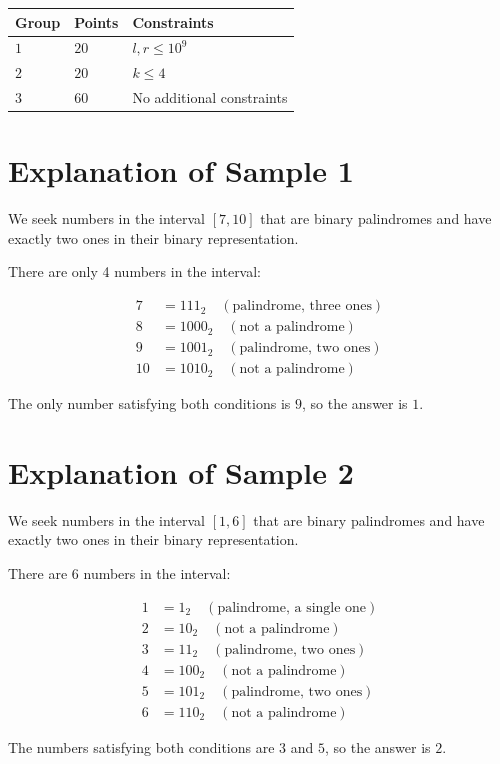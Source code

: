 \noindent
\begin{tabular}{| l | l | p{12cm} |}
  \hline
  \textbf{Group} & \textbf{Points} & \textbf{Constraints} \\ \hline
  $1$    & $20$       & $l,r \leq 10^9$ \\ \hline
  $2$    & $20$       & $k \leq 4$ \\ \hline
  $3$    & $60$       & No additional constraints \\ \hline
\end{tabular}

\section*{Explanation of Sample 1}

We seek numbers in the interval $[7, 10]$ that are binary palindromes and have exactly two ones in their binary representation.

There are only 4 numbers in the interval:

\begin{align*}
7 &= 111_2 \quad (\text{palindrome, three ones}) \\ 
8 &= 1000_2 \quad (\text{not a palindrome}) \\
9 &= 1001_2 \quad (\text{palindrome, two ones}) \\
10 &= 1010_2 \quad (\text{not a palindrome})
\end{align*}

The only number satisfying both conditions is $9$, so the answer is $1$.

\section*{Explanation of Sample 2}

We seek numbers in the interval $[1, 6]$ that are binary palindromes and have exactly two ones in their binary representation.

There are 6 numbers in the interval:

\begin{align*}
1 &= 1_2 \quad (\text{palindrome, a single one}) \\
2 &= 10_2 \quad (\text{not a palindrome}) \\
3 &= 11_2 \quad (\text{palindrome, two ones}) \\
4 &= 100_2 \quad (\text{not a palindrome}) \\
5 &= 101_2 \quad (\text{palindrome, two ones}) \\
6 &= 110_2 \quad (\text{not a palindrome})
\end{align*}

The numbers satisfying both conditions are $3$ and $5$, so the answer is $2$.
